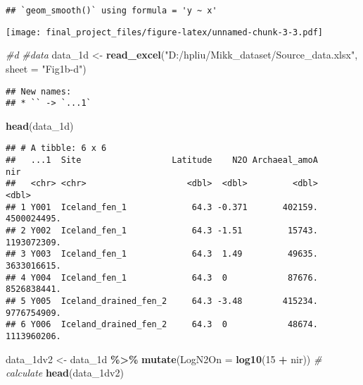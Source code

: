 \documentclass[
]{article}
\newenvironment{Shaded}{\begin{snugshade}}{\end{snugshade}}
\newcommand{\AttributeTok}[1]{\textcolor[rgb]{0.13,0.29,0.53}{#1}}
\newcommand{\CommentTok}[1]{\textcolor[rgb]{0.56,0.35,0.01}{\textit{#1}}}
\newcommand{\DecValTok}[1]{\textcolor[rgb]{0.00,0.00,0.81}{#1}}
\newcommand{\FunctionTok}[1]{\textcolor[rgb]{0.13,0.29,0.53}{\textbf{#1}}}
\newcommand{\NormalTok}[1]{#1}
\newcommand{\OtherTok}[1]{\textcolor[rgb]{0.56,0.35,0.01}{#1}}
\newcommand{\SpecialCharTok}[1]{\textcolor[rgb]{0.81,0.36,0.00}{\textbf{#1}}}
\newcommand{\StringTok}[1]{\textcolor[rgb]{0.31,0.60,0.02}{#1}}
\begin{document}
\begin{verbatim}
## `geom_smooth()` using formula = 'y ~ x'
\end{verbatim}

\texttt{[image: final\_project\_files/figure-latex/unnamed-chunk-3-3.pdf]}

\begin{Shaded}
\begin{Highlighting}[]
\CommentTok{\#d}
\CommentTok{\#data}
\NormalTok{data\_1d }\OtherTok{\textless{}{-}} \FunctionTok{read\_excel}\NormalTok{(}\StringTok{"D:/hpliu/Mikk\_dataset/Source\_data.xlsx"}\NormalTok{, }\AttributeTok{sheet =} \StringTok{"Fig1b{-}d"}\NormalTok{)}
\end{Highlighting}
\end{Shaded}

\begin{verbatim}
## New names:
## * `` -> `...1`
\end{verbatim}

\begin{Shaded}
\begin{Highlighting}[]
\FunctionTok{head}\NormalTok{(data\_1d)}
\end{Highlighting}
\end{Shaded}

\begin{verbatim}
## # A tibble: 6 x 6
##   ...1  Site                  Latitude    N2O Archaeal_amoA         nir
##   <chr> <chr>                    <dbl>  <dbl>         <dbl>       <dbl>
## 1 Y001  Iceland_fen_1             64.3 -0.371       402159. 4500024495.
## 2 Y002  Iceland_fen_1             64.3 -1.51         15743. 1193072309.
## 3 Y003  Iceland_fen_1             64.3  1.49         49635. 3633016615.
## 4 Y004  Iceland_fen_1             64.3  0            87676. 8526838441.
## 5 Y005  Iceland_drained_fen_2     64.3 -3.48        415234. 9776754909.
## 6 Y006  Iceland_drained_fen_2     64.3  0            48674. 1113960206.
\end{verbatim}

\begin{Shaded}
\begin{Highlighting}[]
\NormalTok{data\_1dv2 }\OtherTok{\textless{}{-}}\NormalTok{ data\_1d  }\SpecialCharTok{\%\textgreater{}\%}
  \FunctionTok{mutate}\NormalTok{(}\AttributeTok{LogN2On =} \FunctionTok{log10}\NormalTok{(}\DecValTok{15} \SpecialCharTok{+}\NormalTok{ nir)) }\CommentTok{\# calculate}
\FunctionTok{head}\NormalTok{(data\_1dv2)}
\end{Highlighting}
\end{Shaded}
\end{document}
